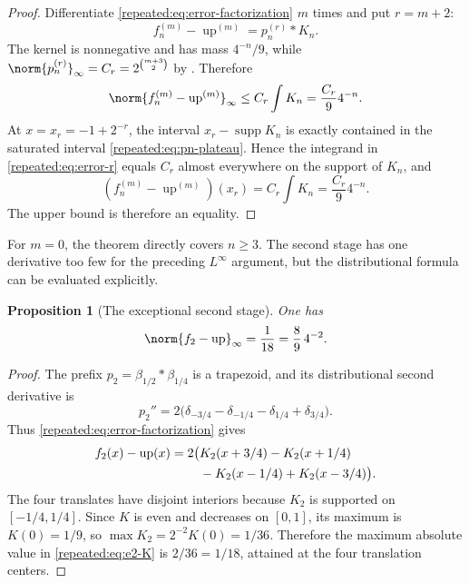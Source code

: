 \documentclass[11pt,oneside]{article}
\newtheorem{proposition}[theorem]{Proposition}
\theoremstyle{definition}
\theoremstyle{remark}
\newcommand{\Up}{\operatorname{up}}
\newcommand{\supp}{\operatorname{supp}}
\begin{document}
\begin{proof}
Differentiate \eqref{repeated:eq:error-factorization} $m$ times and put $r=m+2$:
\begin{equation}
 f_n^{(m)}-\Up^{(m)}=p_n^{(r)}*K_n.                        \label{repeated:eq:error-r}
\end{equation}
The kernel is nonnegative and has mass $4^{-n}/9$, while
$\norm{p_n^{(r)}}_\infty=C_r=2^{\binom{m+3}{2}}$ by
.  Therefore
\[
 \norm{f_n^{(m)}-\Up^{(m)}}_\infty
 \le C_r\int K_n
 =\frac{C_r}{9}4^{-n}.
\]
At $x=x_r=-1+2^{-r}$, the interval $x_r-\supp K_n$ is exactly contained in the saturated
interval \eqref{repeated:eq:pn-plateau}.  Hence the integrand in \eqref{repeated:eq:error-r} equals $C_r$ almost
everywhere on the support of $K_n$, and
\[
 (f_n^{(m)}-\Up^{(m)})(x_r)=C_r\int K_n=\frac{C_r}{9}4^{-n}.
\]
The upper bound is therefore an equality.
\end{proof}

For $m=0$, the theorem directly covers $n\ge3$.  The second stage has one derivative too few
for the preceding $L^\infty$ argument, but the distributional formula can be evaluated
explicitly.

\begin{proposition}[The exceptional second stage]
\label{repeated:prop:n2-error}
One has
\begin{equation}
 \norm{f_2-\Up}_\infty=\frac1{18}=\frac89\,4^{-2}.         \label{repeated:eq:n2-error}
\end{equation}
\end{proposition}

\begin{proof}
The prefix $p_2=\beta_{1/2}*\beta_{1/4}$ is a trapezoid, and its distributional second
derivative is
\begin{equation}
 p_2''=2\bigl(\delta_{-3/4}-\delta_{-1/4}-\delta_{1/4}+\delta_{3/4}\bigr).    \label{repeated:eq:p2-second}
\end{equation}
Thus \eqref{repeated:eq:error-factorization} gives
\begin{align}
 f_2(x)-\Up(x)=2\bigl(&K_2(x+3/4)-K_2(x+1/4)\notag\\
                     &-K_2(x-1/4)+K_2(x-3/4)\bigr).        \label{repeated:eq:e2-K}
\end{align}
The four translates have disjoint interiors because $K_2$ is supported on $[-1/4,1/4]$.
Since $K$ is even and decreases on $[0,1]$, its maximum is $K(0)=1/9$, so
$\max K_2=2^{-2}K(0)=1/36$.  Therefore the maximum absolute value in \eqref{repeated:eq:e2-K} is
$2/36=1/18$, attained at the four translation centers.
\end{proof}
\end{document}
